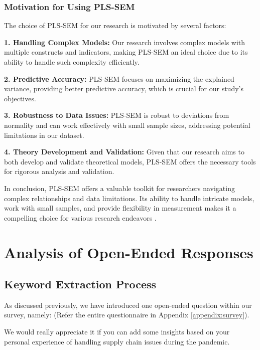 \subsubsection{Motivation for Using PLS-SEM}

The choice of PLS-SEM for our research is motivated by several factors:

\textbf{1. Handling Complex Models:} Our research involves complex models with multiple constructs and indicators, making PLS-SEM an ideal choice due to its ability to handle such complexity efficiently.

\textbf{2. Predictive Accuracy:} PLS-SEM focuses on maximizing the explained variance, providing better predictive accuracy, which is crucial for our study's objectives.

\textbf{3. Robustness to Data Issues:} PLS-SEM is robust to deviations from normality and can work effectively with small sample sizes, addressing potential limitations in our dataset.

\textbf{4. Theory Development and Validation:} Given that our research aims to both develop and validate theoretical models, PLS-SEM offers the necessary tools for rigorous analysis and validation.

In conclusion, PLS-SEM offers a valuable toolkit for researchers navigating complex relationships and data limitations. Its ability to handle intricate models, work with small samples, and provide flexibility in measurement makes it a compelling choice for various research endeavors \parencite{Tenenhaus2005PLSModeling}.



\section{Analysis of Open-Ended Responses}
\label{sec:keyword-analysis}

\subsection{Keyword Extraction Process}

As discussed previously, we have introduced one open-ended question within our survey, namely: (Refer the entire questionnaire in Appendix \ref{appendix:survey}).

\begin{tcolorbox}[colback=blue!5!white, colframe=blue!15!black, boxrule=0.5mm, title=Subjective Question, fonttitle=\bfseries]
  We would really appreciate it if you can add some insights based on your personal experience of handling supply chain issues during the pandemic.
\end{tcolorbox}

